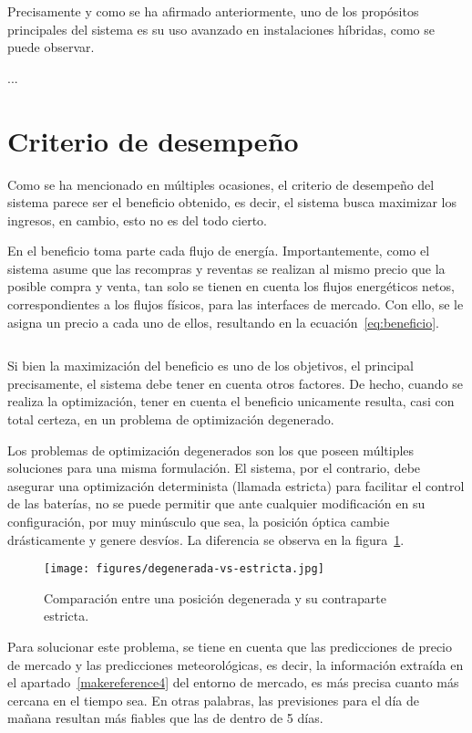 Precisamente y como se ha afirmado anteriormente, uno de los propósitos principales del sistema es su uso avanzado en instalaciones híbridas, como se puede observar.

...

\section{Criterio de desempeño}
\label{makereference5.4}

Como se ha mencionado en múltiples ocasiones, el criterio de desempeño del sistema parece ser el beneficio obtenido, es decir, el sistema busca maximizar los ingresos, en cambio, esto no es del todo cierto.

En el beneficio toma parte cada flujo de energía. Importantemente, como el sistema asume que las recompras y reventas se realizan al mismo precio que la posible compra y venta, tan solo se tienen en cuenta los flujos energéticos netos, correspondientes a los flujos físicos, para las interfaces de mercado. Con ello, se le asigna un precio a cada uno de ellos, resultando en la ecuación~\ref{eq:beneficio}.

\begin{equation}
  \label{eq:beneficio}
\end{equation}

Si bien la maximización del beneficio es uno de los objetivos, el principal precisamente, el sistema debe tener en cuenta otros factores. De hecho, cuando se realiza la optimización, tener en cuenta el beneficio unicamente resulta, casi con total certeza, en un problema de optimización degenerado.

Los problemas de optimización degenerados son los que poseen múltiples soluciones para una misma formulación. El sistema, por el contrario, debe asegurar una optimización determinista (llamada estricta) para facilitar el control de las baterías, no se puede permitir que ante cualquier modificación en su configuración, por muy minúsculo que sea, la posición óptica cambie drásticamente y genere desvíos. La diferencia se observa en la figura~\ref{fig:degenerada-vs-estricta}.

\begin{figure}
  \centering
  \texttt{[image: figures/degenerada-vs-estricta.jpg]}
  \caption{Comparación entre una posición degenerada y su contraparte estricta.}
  \label{fig:degenerada-vs-estricta}
\end{figure}

Para solucionar este problema, se tiene en cuenta que las predicciones de precio de mercado y las predicciones meteorológicas, es decir, la información extraída en el apartado~\ref{makereference4} del entorno de mercado, es más precisa cuanto más cercana en el tiempo sea. En otras palabras, las previsiones para el día de mañana resultan más fiables que las de dentro de 5 días.

